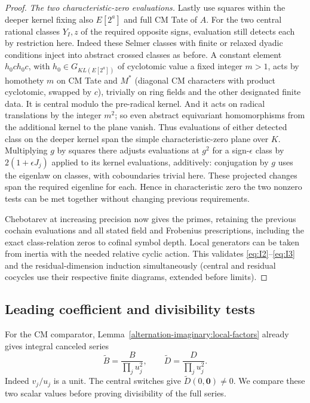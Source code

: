 \begin{proof}
\emph{The two characteristic-zero evaluations.}
Lastly use squares within the deeper kernel fixing also \(E[2^a]\) and full CM Tate of \(A\). For the two central rational classes \(Y_I,z\) of the required opposite signs, evaluation still detects each by restriction here. Indeed these Selmer classes with finite or relaxed dyadic conditions inject into abstract crossed classes as before. A constant element \(h_0 c h_0 c\), with \(h_0\in G_{K L(E[2^a])}\) of cyclotomic value a fixed integer \(m>1\), acts by homothety \(m\) on CM Tate and \(M^*\) (diagonal CM characters with product cyclotomic, swapped by \(c\)), trivially on ring fields and the other designated finite data. It is central modulo the pre-radical kernel. And it acts on radical translations by the integer \(m^2\); so even abstract equivariant homomorphisms from the additional kernel to the plane vanish. Thus evaluations of either detected class on the deeper kernel span the simple characteristic-zero plane over \(K\). Multiplying \(g\) by squares there adjusts evaluations at \(g^2\) for a sign-\(\epsilon\) class by \(2(1+\epsilon J_j)\) applied to its kernel evaluations, additively: conjugation by \(g\) uses the eigenlaw on classes, with coboundaries trivial here. These projected changes span the required eigenline for each. Hence in characteristic zero the two nonzero tests can be met together without changing previous requirements.

Chebotarev at increasing precision now gives the primes, retaining the previous cochain evaluations and all stated field and Frobenius prescriptions, including the exact class-relation zeros to cofinal symbol depth. Local generators can be taken from inertia with the needed relative cyclic action. This validates \eqref{eq:I2}--\eqref{eq:I3} and the residual-dimension induction simultaneously (central and residual cocycles use their respective finite diagrams, extended before limits).
\end{proof}

\subsection{Leading coefficient and divisibility tests}

For the CM comparator, Lemma~\ref{alternation-imaginary:local-factors}
already gives integral canceled series
\[
 \widetilde B=\frac{B}{\prod_j u_j^2},\qquad
 \widetilde D=\frac{D}{\prod_j u_j^2}.
\]
Indeed \(v_j/u_j\) is a unit. The central switches give
\(\widetilde D(0,\mathbf0)\ne0\). We compare these two scalar values
before proving divisibility of the full series.

